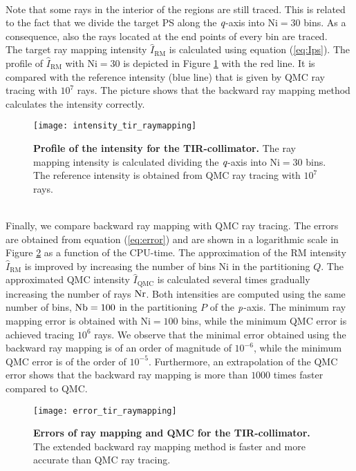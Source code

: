 \\ \indent Note that some rays in the interior of the regions are still traced. This is related to the fact that we divide the target PS along the $\textit{q}$-axis into $\textrm{Ni}=30$ bins. As a consequence, also the rays located at the end points of every bin are traced. \\
\indent The target ray mapping intensity $\hat{I}_{\textrm{RM}}$ is calculated using equation (\ref{eq:Ips}). The profile of $\hat{I}_{\textrm{RM}}$ with $\textrm{Ni}=30$ is depicted in Figure \ref{fig:intensity_tir_raymapping} with the red line. It is compared with the reference intensity (blue line) that is given by QMC ray tracing with $10^7$ rays. The picture shows that the backward ray mapping method calculates the intensity correctly.
\begin{figure}[t]
  \begin{center}
  \texttt{[image: intensity\_tir\_raymapping]}
  \end{center}
  \caption{\textbf{Profile of the intensity for the TIR-collimator.}
 The ray mapping intensity is calculated dividing the $\textit{q}$-axis into $\textrm{Ni}=30$ bins. The reference intensity is obtained from QMC ray tracing with $10^7$ rays.}
\label{fig:intensity_tir_raymapping}
 \end{figure}
\\ \indent 
Finally, we compare backward ray mapping with QMC ray tracing. The errors are obtained from equation (\ref{eq:error}) and are shown in a logarithmic scale in Figure \ref{fig:error_tir_raymapping} as a function of the CPU-time. The approximation of the RM intensity $\hat{I}_{\textrm{RM}}$ is improved by increasing the number of bins $\textrm{Ni}$ in the partitioning $Q$. The approximated QMC intensity $\hat{I}_{\textrm{QMC}}$ is calculated several times gradually increasing the number of rays $\textrm{Nr}$. Both intensities are computed using the same number of bins, $\textrm{Nb}=100$ in the partitioning $P$ of the $\textit{p}$-axis. The minimum ray mapping error is obtained with $\textrm{Ni}=100$ bins, while the minimum QMC error is achieved tracing $10^6$ rays. We observe that the minimal error obtained using the backward ray mapping is of an order of magnitude of $10^{-6}$, while the minimum QMC error is of the order of $10^{-5}$. Furthermore, an extrapolation of the QMC error shows that the backward ray mapping is more than $1000$ times faster compared to QMC.
\begin{figure}[t]
  \begin{center}
  \texttt{[image: error\_tir\_raymapping]}
  \end{center}
  \caption{\textbf{Errors of ray mapping and QMC for the TIR-collimator.}
 The extended backward ray mapping method is faster and more accurate than QMC ray tracing.}
\label{fig:error_tir_raymapping}
 \end{figure}
